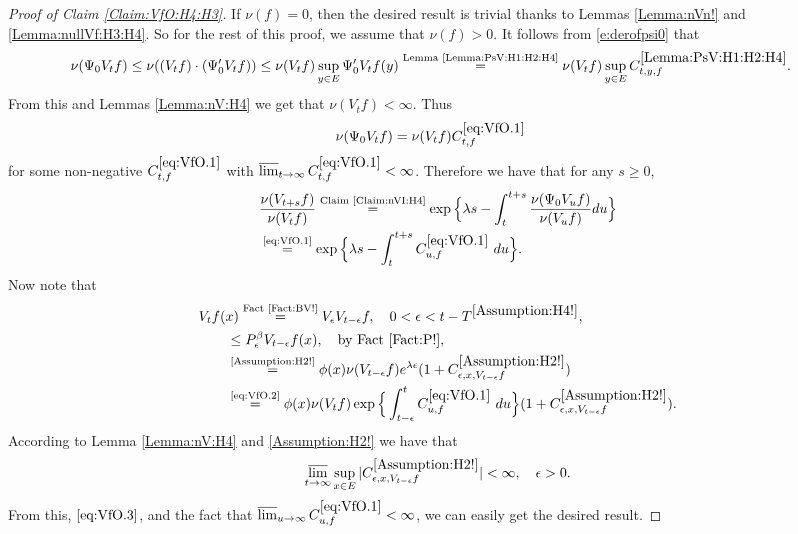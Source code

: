 \documentclass[12pt,a4paper]{amsart}
\numberwithin{equation}{section}
\theoremstyle{plain}
\theoremstyle{definition}
\theoremstyle{remark}
\newcounter{N}
\newcounter{n}[N]
\begin{document}
\begin{proof}[{Proof of Claim \ref{Claim:VfO:H4:H3}}]
If $\nu(f) = 0$, then the desired result is trivial thanks to Lemmas \ref{Lemma:nVn!} and \ref{Lemma:nullVf:H3:H4}.
So for the rest of this proof, we assume that $\nu(f)>0$.
It follows from \eqref{e:derofpsi0} that
\begin{align}
  &\nu(\Psi_0 V_tf)
\leq \nu((V_tf)\cdot (\Psi_0' V_tf)) \leq \nu(V_tf) \sup_{y\in E} \Psi_0' V_tf(y)
\overset{\text{Lemma \ref{Lemma:PsV:H1:H2:H4}}}= \nu(V_tf) \sup_{y\in E} C^{\ref{Lemma:PsV:H1:H2:H4}}_{t,y,f}.
  \end{align}
From this and Lemmas \ref{Lemma:nV:H4}  we get that $\nu(V_tf) <\infty$. Thus
 \begin{align} \label{eq:VfO.1}
 	& \nu(\Psi_0 V_t f)  = \nu(V_tf) C^{\eqref{eq:VfO.1}}_{t,f}
 \end{align}
 for some non-negative $C^{\eqref{eq:VfO.1}}_{t,f} $ with $\varlimsup_{t\to \infty} C^{\eqref{eq:VfO.1}}_{t,f}  < \infty$.
Therefore we have that for any $s\geq 0$,
\begin{align}
&  \frac{\nu(V_{t+s} f)} {\nu(V_t f)} \overset{\text{Claim \ref{Claim:nVI:H4}}}= \exp\Big\{ \lambda s - \int_t^{t+s} \frac{\nu(\Psi_0 V_u f) }{\nu(V_u f)} du\Big\}
\\&\label{eq:VfO.2} \overset{\text{\eqref{eq:VfO.1}}}= \exp\Big\{ \lambda s - \int_t^{t+s} C^{\eqref{eq:VfO.1}}_{u,f} ~du\Big\}. \end{align}
Now note that
\begin{align}
 \MoveEqLeft V_{t}f(x) \overset{\text{Fact \ref{Fact:BV!}}}= V_{\epsilon} V_{t-\epsilon} f , \quad 0<\epsilon < t- T^{\ref{Assumption:H4!}} ,
 \\&\leq P_\epsilon^\beta V_{t-\epsilon} f(x),\quad\text{by Fact \ref{Fact:P!}},
  \\& \overset{\text{\ref{Assumption:H2!}}}= \phi(x) \nu(V_{t-\epsilon}f) e^{\lambda  \epsilon} (1+C_{\epsilon,x, V_{t-\epsilon} f}^{\ref{Assumption:H2!}} )
\\& \label{eq:VfO.3}\overset{\text{\eqref{eq:VfO.2}}}= \phi(x)\nu(V_{t}f)\exp\Big\{ \int_{t-\epsilon}^t C^{\eqref{eq:VfO.1}}_{u,f} ~du\Big\} (1+C_{\epsilon,x, V_{t-\epsilon} f}^{\ref{Assumption:H2!}} ).
  \end{align}
According to Lemma \ref{Lemma:nV:H4}  and \ref{Assumption:H2!} we have that
\[\varlimsup_{t\to \infty}\sup_{x\in E} |C_{\epsilon,x, V_{t-\epsilon} f}^{\ref{Assumption:H2!}}| < \infty, \quad \epsilon > 0.\]
From this, $\eqref{eq:VfO.3}$, and the fact that $\varlimsup_{u\to \infty} C^{\eqref{eq:VfO.1}}_{u,f}  < \infty$, we can easily get the desired result.
\end{proof}
\end{document}
